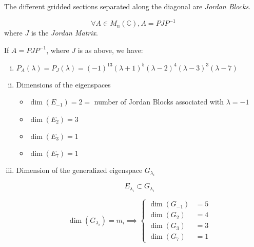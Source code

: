 The different gridded sections separated along the diagonal are \textit{Jordan Blocks}.

\begin{theorem}
	\[\forall A \in M_n(\mathbb{C}), A = PJP^{-1}\] where $J$ is the \textit{Jordan Matrix}.
\end{theorem}

\begin{remark}
	If $A = PJP^{-1}$, where $J$ is as above, we have:

	\begin{enumerate}[i)]
		\item $P_A(\lambda) = P_J(\lambda) = (-1)^{13}(\lambda+1)^5(\lambda-2)^4(\lambda-3)^3(\lambda-7)$
		\item Dimensions of the eigenspaces
		\begin{itemize}
			\item $\dim(E_{-1}) = 2 =$ number of Jordan Blocks associated with $\lambda = -1$
			\item $\dim(E_2) = 3$
			\item $\dim(E_3) = 1$
			\item $\dim(E_7) = 1$
		\end{itemize}
		\item Dimension of the generalized eigenspace $G_{\lambda_i}$
		
		\[E_{\lambda_i} \subset G_{\lambda_i}\]

		\[\dim(G_{\lambda_i}) = m_i \implies \begin{cases}
			\dim(G_{-1}) &= 5\\
			\dim(G_{2})	&= 4\\
			\dim(G_{3})	&= 3\\	
			\dim(G_{7})	&= 1
		\end{cases}\]
	\end{enumerate}
\end{remark}

